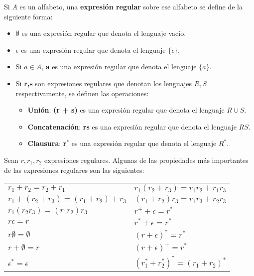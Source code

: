 Si $A$ es un alfabeto, una \textbf{expresión regular} sobre ese alfabeto se define de la siguiente forma:

\begin{itemize}
    \item $\emptyset$ es una expresión regular que denota el lenguaje vacío.
    \item $\epsilon$ es una expresión regular que denota el lenguaje $\lbrace \epsilon \rbrace$.
    \item Si $a \in A$, \textbf{a} es una expresión regular que denota el lenguaje $\lbrace a \rbrace$.
    \item Si \textbf{r,s} son expresiones regulares que denotan los lenguajes $R,S$ respectivamente, se definen las operaciones:
    \begin{itemize}
        \item \textbf{Unión}: \textbf{(r + s)} es una expresión regular que denota el lenguaje $R \cup S$.
        \item \textbf{Concatenación}: \textbf{rs} es una expresión regular que denota el lenguaje $RS$.
        \item \textbf{Clausura}: \textbf{r$^*$} es una expresión regular que denota el lenguaje $R^*$.
    \end{itemize}
\end{itemize}

Sean $r,r_1,r_2$ expresiones regulares. Algunas de las propiedades más importantes de las expresiones regulares son las siguientes:
\vspace{0.5cm}
\newline
\begin{tabular}{ll}
    $r_1 + r_2 = r_2 + r_1$ & $r_1(r_2+r_3) = r_1r_2 + r_1r_3$ \\
    $r_1 + (r_2 + r_3) = (r_1 + r_2) + r_3$ & $(r_1+r_2)r_3 = r_1r_3 + r_2r_3$ \\
    $r_1(r_2r_3) = (r_1r_2)r_3$ & $r^+ + \epsilon = r^*$ \\
    $r\epsilon = r$ & $r^* + \epsilon = r^*$ \\
    $r\emptyset = \emptyset$ & $(r+\epsilon)^* = r^*$ \\
    $r+\emptyset = r$ & $(r+\epsilon)^+ = r^*$ \\
    $\epsilon^* = \epsilon$ & $(r_1^*+r_2^*)^* = (r_1+r_2)^*$ \\
\end{tabular}
\vspace{0.5cm}


